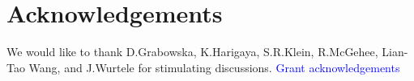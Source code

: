 \documentclass[twocolumn,showpacs,preprintnumbers,amsmath,amssymb,prd]{revtex4}
\begin{document}
\section*{Acknowledgements}
We would like to thank D.Grabowska, K.Harigaya, S.R.Klein, R.McGehee, Lian-Tao Wang, and J.Wurtele for stimulating discussions.
\textcolor{blue}{Grant acknowledgements}


\end{document}
